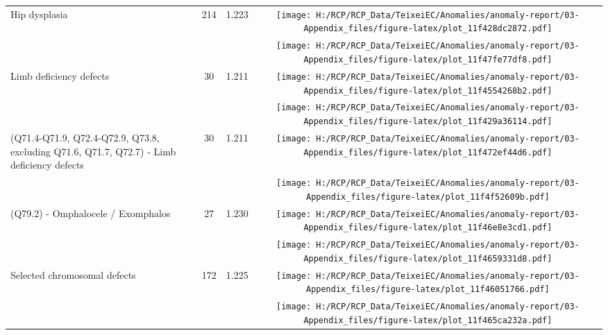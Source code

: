 \documentclass[
]{krantz}
\begin{document}
\begin{longtable}[t]{>{\raggedright\arraybackslash}m{4cm}cc>{}c}
Hip dysplasia & 214 & 1.223 & \texttt{[image: H:/RCP/RCP\_Data/TeixeiEC/Anomalies/anomaly-report/03-Appendix\_files/figure-latex/plot\_11f428dc2872.pdf]}\\
\addlinespace
\cellcolor{gray!6}{(Q65) - Hip dysplasia} & \cellcolor{gray!6}{214} & \cellcolor{gray!6}{1.223} & \cellcolor{gray!6}{}\texttt{[image: H:/RCP/RCP\_Data/TeixeiEC/Anomalies/anomaly-report/03-Appendix\_files/figure-latex/plot\_11f47fe77df8.pdf]}\\
Limb deficiency defects & 30 & 1.211 & \texttt{[image: H:/RCP/RCP\_Data/TeixeiEC/Anomalies/anomaly-report/03-Appendix\_files/figure-latex/plot\_11f4554268b2.pdf]}\\
\cellcolor{gray!6}{(Q79.0) - Diaphragmatic hernia} & \cellcolor{gray!6}{28} & \cellcolor{gray!6}{1.239} & \cellcolor{gray!6}{}\texttt{[image: H:/RCP/RCP\_Data/TeixeiEC/Anomalies/anomaly-report/03-Appendix\_files/figure-latex/plot\_11f429a36114.pdf]}\\
(Q71.4-Q71.9, Q72.4-Q72.9, Q73.8, excluding Q71.6, Q71.7, Q72.7) - Limb deficiency defects & 30 & 1.211 & \texttt{[image: H:/RCP/RCP\_Data/TeixeiEC/Anomalies/anomaly-report/03-Appendix\_files/figure-latex/plot\_11f472ef44d6.pdf]}\\
\cellcolor{gray!6}{Selected abdominal wall defects} & \cellcolor{gray!6}{88} & \cellcolor{gray!6}{1.231} & \cellcolor{gray!6}{}\texttt{[image: H:/RCP/RCP\_Data/TeixeiEC/Anomalies/anomaly-report/03-Appendix\_files/figure-latex/plot\_11f4f52609b.pdf]}\\
\addlinespace
(Q79.2) - Omphalocele / Exomphalos & 27 & 1.230 & \texttt{[image: H:/RCP/RCP\_Data/TeixeiEC/Anomalies/anomaly-report/03-Appendix\_files/figure-latex/plot\_11f46e8e3cd1.pdf]}\\
\cellcolor{gray!6}{(Q79.3) - Gastroschisis} & \cellcolor{gray!6}{34} & \cellcolor{gray!6}{1.225} & \cellcolor{gray!6}{}\texttt{[image: H:/RCP/RCP\_Data/TeixeiEC/Anomalies/anomaly-report/03-Appendix\_files/figure-latex/plot\_11f4659331d8.pdf]}\\
Selected chromosomal defects & 172 & 1.225 & \texttt{[image: H:/RCP/RCP\_Data/TeixeiEC/Anomalies/anomaly-report/03-Appendix\_files/figure-latex/plot\_11f46051766.pdf]}\\
\cellcolor{gray!6}{(Q90) - Down Syndrome} & \cellcolor{gray!6}{121} & \cellcolor{gray!6}{1.225} & \cellcolor{gray!6}{}\texttt{[image: H:/RCP/RCP\_Data/TeixeiEC/Anomalies/anomaly-report/03-Appendix\_files/figure-latex/plot\_11f465ca232a.pdf]}\\

\end{longtable}
\end{document}

